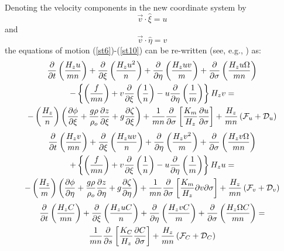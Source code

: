 Denoting the velocity components in the new coordinate system by
\begin{equation}
   \vec{v} \cdot \hat{\xi} = u
\end{equation}
and
\begin{equation}
   \vec{v} \cdot \hat{\eta} = v
\end{equation}
the equations of motion (\ref{st6})-(\ref{st10}) can be re-written
(see, e.g., \cite{AL}) as:
{\samepage
\begin{multline}
   \frac{\partial}{\partial t} \left( \frac{H_z u}{mn} \right) + \frac
   {\partial}{\partial \xi} \left( \frac{H_z u^2}{n} \right ) + \frac
   {\partial}{\partial \eta} \left( \frac{H_z uv}{m} \right) + \frac
   {\partial}{\partial \sigma} \left( \frac{H_z u\Omega}{mn} \right)
\\
   - \left\{\left(\frac{f}{mn} \right) + v \frac{\partial}{\partial \xi}
   \left( \frac{1}{n} \right) - u \frac{\partial}{\partial \eta} \left(
   \frac{1}{m} \right) \right\} H_z v =
\\
   -\left( \frac{H_z }{n} \right )
   \left( \frac{\partial \phi}{\partial \xi} +
   \frac{g \rho}{\rho_o} \frac{\partial z}{\partial \xi} +
   g \frac{\partial \zeta}{\partial \xi} \right) +
   \frac{ 1}{mn} \frac{\partial}{\partial \sigma}
   \left[ \frac{K_m}{H_z} \frac{\partial u}{\partial \sigma} \right] +
   \frac{ H_z}{mn}
   \left( {\cal F}_u + {\cal D}_u \right)
\label{st13}
\end{multline}
}
{\samepage
\begin{multline}
   \frac{\partial}{\partial t} \left( \frac{H_z v}{mn} \right) + \frac
   {\partial}{\partial \xi} \left( \frac{H_z uv}{n} \right ) + \frac
   {\partial}{\partial \eta} \left( \frac{H_z v^2}{m} \right) + \frac
   {\partial}{\partial \sigma} \left( \frac{H_z v\Omega}{mn} \right)
\\
   + \left\{\left(\frac{f}{mn} \right) + v \frac{\partial}{\partial \xi}
   \left( \frac{1}{n} \right) - u \frac{\partial}{\partial \eta} \left(
   \frac{1}{m} \right) \right\} H_z u =
\\
   -\left( \frac{H_z }{m} \right )
   \left( \frac{\partial \phi}{\partial \eta} +
   \frac{g \rho}{\rho_o} \frac{\partial z}{\partial \eta} +
   g \frac{\partial \zeta}{\partial \eta} \right) +
   \frac{ 1}{mn} \frac{\partial}{\partial \sigma}
   \left[ \frac{K_m}{H_z} {\partial v}{\partial \sigma} \right] +
   \frac{ H_z}{mn}
   \left( {\cal F}_v + {\cal D}_v \right)
\label{st14}
\end{multline}
}
\begin{multline}
   \frac{\partial}{\partial t} \left( \frac{H_z C}{mn} \right) +
   \frac {\partial}{\partial \xi} \left( \frac{H_z uC}{n} \right ) +
   \frac {\partial}{\partial \eta} \left( \frac{H_z vC}{m} \right) +
   \frac {\partial}{\partial \sigma}
   \left( \frac{H_z \Omega C}{mn} \right) =
\\
   \frac{ 1}{mn} \frac{\partial}{\partial s}
   \left[ \frac{K_C}{H_z} \frac{\partial C}{\partial \sigma} \right] +
   \frac{ H_z}{mn}
   \left( {\cal F}_{C} + {\cal D}_{C} \right)
\label{st15}
\end{multline}
